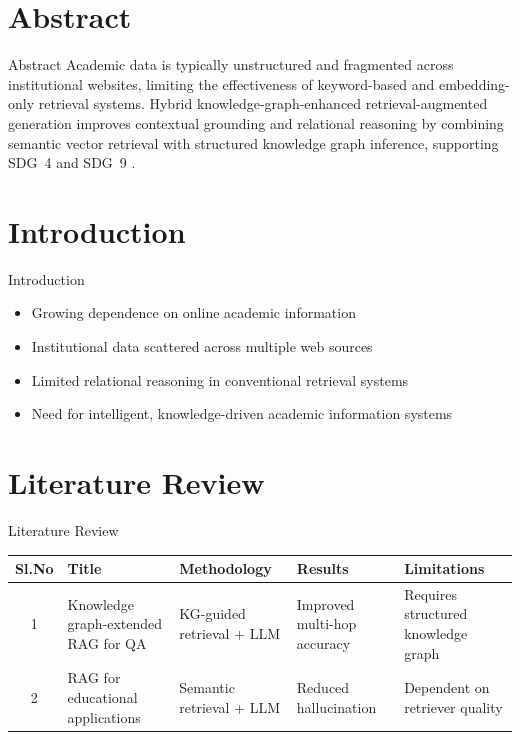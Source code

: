 \documentclass[10pt,aspectratio=1610]{beamer}
\begin{document}
\section{Abstract}
\begin{frame}{Abstract}
\small
Academic data is typically unstructured and fragmented across institutional websites, limiting the effectiveness of keyword-based and embedding-only retrieval systems. Hybrid knowledge-graph-enhanced retrieval-augmented generation improves contextual grounding and relational reasoning by combining semantic vector retrieval with structured knowledge graph inference, supporting SDG~4 and SDG~9 \cite{kg_rag_springer,rag_edu_elsevier}.
\end{frame}

\section{Introduction}
\begin{frame}{Introduction}
\begin{itemize}
\item Growing dependence on online academic information
\item Institutional data scattered across multiple web sources
\item Limited relational reasoning in conventional retrieval systems
\item Need for intelligent, knowledge-driven academic information systems
\end{itemize}
\end{frame}

\section{Literature Review}
\begin{frame}{Literature Review}
\scriptsize
\begin{tabularx}{\textwidth}{|c|X|X|X|X|}
\hline
Sl.No & Title & Methodology & Results & Limitations\\
\hline
1 & Knowledge graph-extended RAG for QA \cite{kg_rag_springer} 
  & KG-guided retrieval + LLM 
  & Improved multi-hop accuracy 
  & Requires structured knowledge graph\\
\hline
2 & RAG for educational applications \cite{rag_edu_elsevier} 
  & Semantic retrieval + LLM 
  & Reduced hallucination 
  & Dependent on retriever quality\\
\hline
\end{tabularx}
\end{frame}
\end{document}
